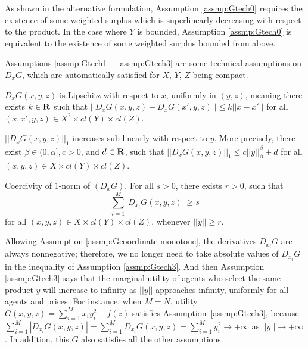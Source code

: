 	As shown in the alternative formulation, Assumption \ref{assmp:Gtech0} requires the existence of some weighted surplus which is superlinearly decreasing with respect to the product. In the case where $Y$ is bounded, Assumption \ref{assmp:Gtech0} is equivalent to the existence of some weighted surplus bounded from above.   \medskip


Assumptions \ref{assmp:Gtech1} - \ref{assmp:Gtech3} are some technical assumptions on $D_xG$, which are automatically satisfied for $X$, $Y$, $Z$ being compact.\medskip



\begin{assumption}\label{assmp:Gtech1}
	$D_x G(x,y,z)$ is Lipschitz with respect to $x$,
	uniformly in $(y,z)$, meaning there exists $k \in {\mathbf R}$ such that
	$||D_xG(x,y,z)-D_x G(x',y,z)||\le k||x-x'||$ %
	for all $(x, x',y, z)\in X^2\times cl(Y) \times cl(Z)$.
\end{assumption}


\begin{assumption}\label{assmp:Gtech2}
	$||D_x G(x,y,z)||_{1}$ increases sub-linearly with respect to $y$. More precisely, there exist $ \beta \in (0, \alpha], c>0$, and $ d\in {\mathbf R}$, such that $||D_x G(x,y,z)||_{1}\le c||y||_{\beta}^{\beta} +d$ for all $ (x, y, z)\in X\times cl(Y) \times cl(Z)$.
\end{assumption}


\begin{assumption}\label{assmp:Gtech3}
	Coercivity of {$1$-norm} of $(D_xG)$. For all $ s>0$, there exists $r>0$, such that 
	$$\sum_{i=1}^{M} |D_{x_i}G(x,y,z)|\ge s$$ 
	for all $(x, y, z)\in X\times  cl(Y) \times cl(Z)$, whenever $||y||\ge r$.
\end{assumption}


{Allowing Assumption \ref{assmp:Gcoordinate-monotone}, {the derivatives $D_{x_i}G$ are always nonnegative; therefore,} we no longer need to take absolute values of $D_{x_i}G$ in the inequality of Assumption \ref{assmp:Gtech3}.} And then Assumption \ref{assmp:Gtech3} says that the marginal utility of agents who select the same product $y$ will increase to infinity as $||y||$ approaches infinity, uniformly for all agents and prices. {For instance, when $M = N$, utility $G(x,y,z) = \sum_{i=1}^{M} x_iy_i^2 -f(z) $ satisfies Assumption~\ref{assmp:Gtech3}, because $\sum_{i=1}^{M} |D_{x_i}G(x,y,z)| = \sum_{i=1}^{M} D_{x_i}G(x,y,z) = \sum_{i=1}^{M} y_i^2 \rightarrow +\infty$ as $||y|| \rightarrow + \infty$.  In addition, this $G$ also satisfies all the other assumptions.}\medskip



